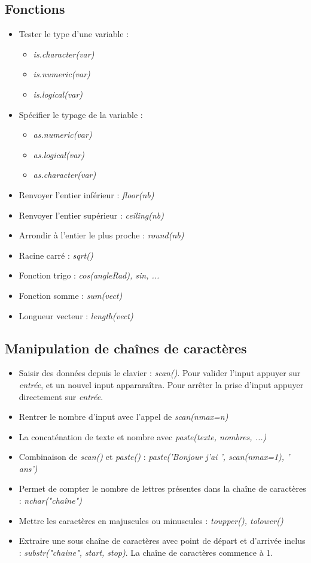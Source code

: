 \documentclass[12pt,a4paper]{article}
\begin{document}
\subsection{Fonctions}
\begin{itemize}
\item Tester le type d'une variable :
\begin{itemize}
\item \textit{is.character(var)}
\item \textit{is.numeric(var)}
\item \textit{is.logical(var)}
\end{itemize}
\item Spécifier le typage de la variable :
\begin{itemize}
\item \textit{as.numeric(var)}
\item \textit{as.logical(var)}
\item \textit{as.character(var)}
\end{itemize}
\item Renvoyer l'entier inférieur : \textit{floor(nb)}
\item Renvoyer l'entier supérieur : \textit{ceiling(nb)}
\item Arrondir à l'entier le plus proche : \textit{round(nb)}
\item Racine carré : \textit{sqrt()}
\item Fonction trigo : \textit{cos(angleRad), sin, ...}
\item Fonction somme : \textit{sum(vect)}
\item Longueur vecteur : \textit{length(vect)}
\end{itemize}

\subsection{Manipulation de chaînes de caractères}
\begin{itemize}
\item Saisir des données depuis le clavier : \textit{scan()}. Pour valider l'input appuyer sur \textit{entrée}, et un nouvel input appararaîtra. Pour arrêter la prise d'input appuyer directement sur \textit{entrée}.
\item Rentrer le nombre d'input avec l'appel de \textit{scan(nmax=n)}
\item La concaténation de texte et nombre avec \textit{paste(texte, nombres, ...)}
\item Combinaison de \textit{scan()} et \textit{paste()} : \textit{paste('Bonjour j'ai ', scan(nmax=1), ' ans')}
\item Permet de compter le nombre de lettres présentes dans la chaîne de caractères : \textit{nchar("chaîne")}
\item Mettre les caractères en majuscules ou minuscules : \textit{toupper(), tolower()}
\item Extraire une sous chaîne de caractères avec point de départ et d'arrivée inclus : \textit{substr("chaine", start, stop)}. La chaîne de caractères commence à 1.
\end{itemize}
\end{document}
